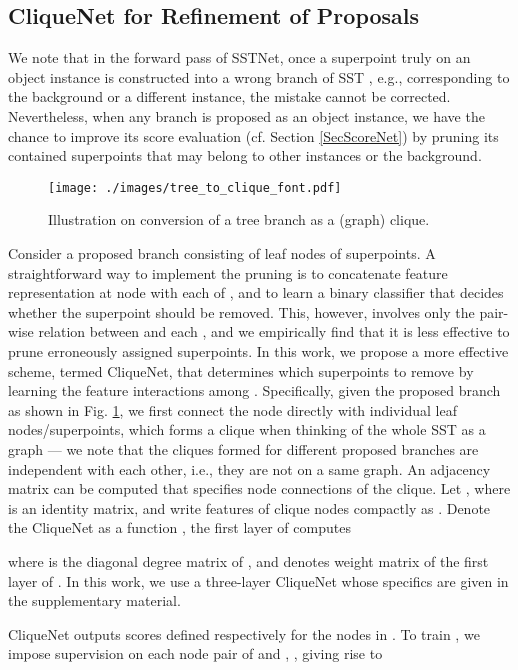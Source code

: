 \documentclass[10pt,twocolumn,letterpaper]{article}
\begin{document}
\subsection{CliqueNet for Refinement of Proposals}

We note that in the forward pass of SSTNet, once a superpoint  truly on an object instance is constructed into a wrong branch  of SST , e.g.,  corresponding to the background or a different instance, the mistake cannot be corrected. Nevertheless, when any branch  is proposed as an object instance, we have the chance to improve its score evaluation (cf. Section \ref{SecScoreNet}) by pruning its contained superpoints that may belong to other instances or the background.

\begin{figure}[htbp]
    \centering
    \texttt{[image: ./images/tree\_to\_clique\_font.pdf]}
    \caption{Illustration on conversion of a tree branch as a (graph) clique.}
    \label{figRefinement}
\end{figure}

Consider a proposed branch  consisting of  leaf nodes of superpoints.  A straightforward way to implement the pruning is to concatenate feature representation  at node  with each  of , and to learn a binary classifier that decides whether the superpoint  should be removed. This, however, involves only the pair-wise relation between  and each , and we empirically find that it is less effective to prune erroneously assigned superpoints. In this work, we propose a more effective scheme, termed CliqueNet, that determines which superpoints to remove by learning the feature interactions among . Specifically, given the proposed branch  as shown in Fig. \ref{figRefinement}, we first connect the node  directly with individual leaf nodes/superpoints, which forms a clique  when thinking of the whole SST  as a graph --- we note that the cliques formed for different proposed branches are independent with each other, i.e., they are not on a same graph. An adjacency matrix  can be computed that specifies node connections of the clique. Let , where  is an identity matrix, and write features of clique nodes compactly as . Denote the CliqueNet as a function , the first layer of  computes

where  is the diagonal degree matrix of , and  denotes weight matrix of the first layer of . In this work, we use a three-layer CliqueNet whose specifics are given in the supplementary material.

CliqueNet outputs scores  defined respectively for the  nodes in . To train , we impose supervision on each node pair of  and , , giving rise to
\end{document}
